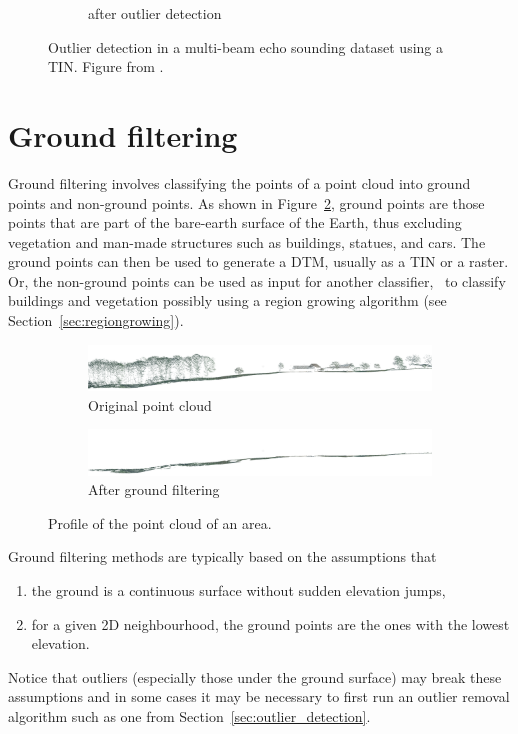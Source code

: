 \begin{figure}
\begin{subfigure}[b]{0.44\linewidth}
    \caption{after outlier detection}
  \end{subfigure}
\caption{Outlier detection in a multi-beam echo sounding dataset using a TIN\@. Figure from \citep{Arge10}.}%
\label{fig:mbes}
\end{figure}


%
\section{Ground filtering}

Ground filtering involves classifying the points of a point cloud into ground points and non-ground points.
As shown in Figure~\ref{fig:filter-profile}, ground points are those points that are part of the bare-earth surface of the Earth, thus excluding vegetation and man-made structures such as buildings, statues, and cars.
The ground points can then be used to generate a DTM, usually as a TIN or a raster.
Or, the non-ground points can be used as input for another classifier, \eg\ to classify buildings and vegetation possibly using a region growing algorithm (see Section~\ref{sec:regiongrowing}).
\begin{figure}
  \centering
  \begin{subfigure}[b]{\linewidth}
    \centering
    \includegraphics[width=\textwidth]{filter-profile-before.png}
    \caption{Original point cloud}
  \end{subfigure}
  \begin{subfigure}[b]{\linewidth}
    \centering
    \includegraphics[width=\textwidth]{filter-profile-after.png}
    \caption{After ground filtering}
  \end{subfigure}
  \caption{Profile of the point cloud of an area.}%
  \label{fig:filter-profile}
\end{figure}

%

Ground filtering methods are typically based on the assumptions that 
\begin{enumerate}
  \item the ground is a continuous surface without sudden elevation jumps, 
  \item for a given 2D neighbourhood, the ground points are the ones with the lowest elevation.
\end{enumerate}
Notice that outliers (especially those under the ground surface) may break these assumptions and in some cases it may be necessary to first run an outlier removal algorithm such as one from Section~\ref{sec:outlier_detection}.


